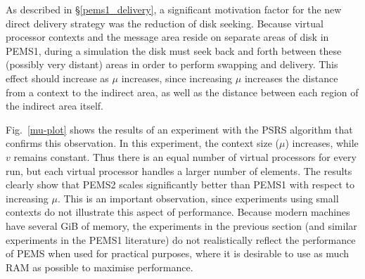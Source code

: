 \documentclass[12pt]{carletoncsthesis}
\begin{document}
As described in \S\ref{pems1_delivery}, a significant motivation factor
for the new direct delivery strategy was the reduction of disk seeking.
Because virtual processor contexts and the message area reside on separate
areas of disk in PEMS1, during a simulation the disk must seek back and forth
between these (possibly very distant) areas in order to perform swapping and
delivery.  This effect should increase as $\mu$ increases, since increasing
$\mu$ increases the distance from a context to the indirect area, as well
as the distance between each region of the indirect area itself.

Fig.~\ref{mu-plot} shows the results of an experiment with the PSRS algorithm
that confirms this observation.  In this experiment, the context size ($\mu$)
increases, while $v$ remains constant.  Thus there is an equal number of
virtual processors for every run, but each virtual processor handles a larger
number of elements.  The results clearly show that PEMS2 scales significantly
better than PEMS1 with respect to increasing $\mu$.  This is an important
observation, since experiments using small contexts do not illustrate this
aspect of performance.  Because modern machines have several GiB of memory,
the experiments in the previous section (and similar experiments in the PEMS1
literature) do not realistically reflect the performance of PEMS when used
for practical purposes, where it is desirable to use as much RAM as possible
to maximise performance.
\end{document}
